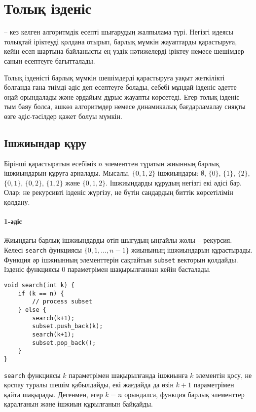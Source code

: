\chapter{Толық ізденіс}

 -- кез келген алгоритмдік есепті шығарудың 
жалпылама түрі. Негізгі идеясы толықтай іріктеуді қолдана отырып, барлық
мүмкін жауаптарды қарастыруға, кейін есеп шартына байланысты ең үздік
нәтижелерді іріктеу немесе шешімдер санын есептеуге бағытталады.

Толық ізденісті барлық мүмкін шешімдерді қарастыруға уақыт жеткілікті болғанда ғана
тиімді әдіс деп есептеуге болады, себебі мұндай ізденіс әдетте оңай орындалады және әрдайым
дұрыс жауапты көрсетеді. Егер толық ізденіс тым баяу болса, ашкөз алгоритмдер немесе 
динамикалық бағдарламалау сияқты өзге әдіс-тәсілдер қажет болуы мүмкін.

\section{Ішжиындар құру}


Бірінші қарастыратын есебіміз  $n$ элементтен тұратын
жиынның барлық ішжиындарын құруға арналады.
Мысалы, $\{0,1,2\}$ ішжиындары:
$\emptyset$, $\{0\}$, $\{1\}$, $\{2\}$, $\{0,1\}$,
$\{0,2\}$, $\{1,2\}$ және $\{0,1,2\}$.
Ішжиындарды құрудың негізгі екі әдісі бар. Олар:
не рекурсивті ізденіс жүргізу, не бүтін сандардың 
биттік көрсетілімін қолдану.

\subsubsection{1-әдіс}

Жиындағы барлық ішжиындарды өтіп шығудың ыңғайлы жолы -- рекурсия.
Келесі \texttt{search} функциясы $\{0,1,\ldots,n-1\}$ жиынының
ішжиындарын құрастырады. Функция әр ішжиынның элементтерін сақтайтын
\texttt{subset} векторын қолдайды. Ізденіс функциясы 0 параметрімен шақырылғаннан кейін
басталады.

\begin{lstlisting}
void search(int k) {
    if (k == n) {
        // process subset
    } else {
        search(k+1);
        subset.push_back(k);
        search(k+1);
        subset.pop_back();
    }
}
\end{lstlisting}

\texttt{search} функциясы $k$ параметрімен шақырылғанда
ішжиынға $k$ элементін қосу, не қоспау туралы шешім қабылдайды,
екі жағдайда да өзін $k+1$ параметрімен қайта шақырады.
Дегенмен, егер $k=n$ орындалса, функция барлық элементтер 
қаралғанын және ішжиын құрылғанын байқайды.

